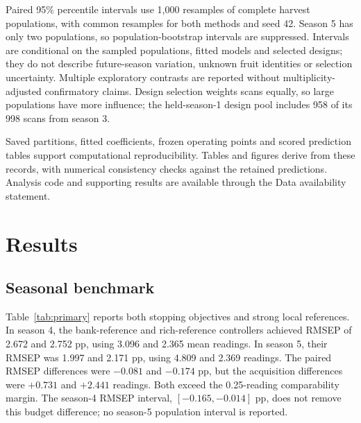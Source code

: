 \documentclass[Review,sagev,times]{sagej}
\begin{document}
Paired 95\% percentile intervals use 1,000 resamples of complete harvest populations, with common resamples for both methods and seed 42. Season 5 has only two populations, so population-bootstrap intervals are suppressed. Intervals are conditional on the sampled populations, fitted models and selected designs; they do not describe future-season variation, unknown fruit identities or selection uncertainty. Multiple exploratory contrasts are reported without multiplicity-adjusted confirmatory claims. Design selection weights scans equally, so large populations have more influence; the held-season-1 design pool includes 958 of its 998 scans from season 3.

Saved partitions, fitted coefficients, frozen operating points and scored prediction tables support computational reproducibility. Tables and figures derive from these records, with numerical consistency checks against the retained predictions. Analysis code and supporting results are available through the Data availability statement.

\section{Results}
\subsection{Seasonal benchmark}
Table~\ref{tab:primary} reports both stopping objectives and strong local references. In season 4, the bank-reference and rich-reference controllers achieved RMSEP of 2.672 and 2.752 pp, using 3.096 and 2.365 mean readings. In season 5, their RMSEP was 1.997 and 2.171 pp, using 4.809 and 2.369 readings. The paired RMSEP differences were $-0.081$ and $-0.174$ pp, but the acquisition differences were $+0.731$ and $+2.441$ readings. Both exceed the 0.25-reading comparability margin. The season-4 RMSEP interval, $[-0.165,-0.014]$ pp, does not remove this budget difference; no season-5 population interval is reported.

\begin{table}[tbp]\centering\small
\caption{Seed-42 seasonal benchmark on seasons 4--5 from the same dataset. RMSEP is in dry-matter pp. ``Readings'' are simulated finite-band acquisitions; a rich-spectrum model uses 103 spectral variables, which are not equivalent physical LED pulses. Static four-channel models can use different subsets from a four-reading adaptive prefix.}\label{tab:primary}

\end{table}
\end{document}

